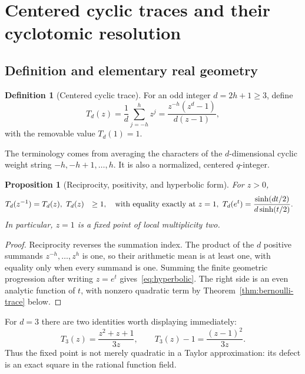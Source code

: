 \documentclass[11pt,oneside]{article}
\newtheorem{proposition}[theorem]{Proposition}
\theoremstyle{definition}
\newtheorem{definition}[theorem]{Definition}
\theoremstyle{remark}
\begin{document}
\section{Centered cyclic traces and their cyclotomic resolution}
\label{sec:trace}

\subsection{Definition and elementary real geometry}

\begin{definition}[Centered cyclic trace]
For an odd integer \(d=2h+1\ge3\), define
\begin{equation}
 T_d(z)=\frac1d\sum_{j=-h}^{h}z^j
 =\frac{z^{-h}(z^d-1)}{d(z-1)},
 \label{eq:Td-definition}
\end{equation}
with the removable value \(T_d(1)=1\).
\end{definition}

The terminology comes from averaging the characters of the \(d\)-dimensional cyclic weight
string \(-h,-h+1,\ldots,h\).  It is also a normalized, centered \(q\)-integer.

\begin{proposition}[Reciprocity, positivity, and hyperbolic form]
\label{prop:basic-trace}
For \(z>0\),
\begin{align}
 T_d(z^{-1})&=T_d(z),\label{eq:reciprocity}\
 T_d(z)&\ge1,\quad\hbox{with equality exactly at }z=1,\label{eq:AMGM}\
 T_d(e^t)&=\frac{\sinh(dt/2)}{d\sinh(t/2)}.\label{eq:hyperbolic}
\end{align}
In particular, \(z=1\) is a fixed point of local multiplicity two.
\end{proposition}

\begin{proof}
Reciprocity reverses the summation index.  The product of the \(d\) positive summands
\(z^{-h},\ldots,z^h\) is one, so their arithmetic mean is at least one, with equality
only when every summand is one.  Summing the finite geometric progression after writing
\(z=e^t\) gives~\eqref{eq:hyperbolic}.  The right side is an even analytic function of
\(t\), with nonzero quadratic term by Theorem~\ref{thm:bernoulli-trace} below.
\end{proof}

For \(d=3\) there are two identities worth displaying immediately:
\begin{equation}
 T_3(z)=\frac{z^2+z+1}{3z},
 \qquad
 T_3(z)-1=\frac{(z-1)^2}{3z}.
 \label{eq:T3-exact}
\end{equation}
Thus the fixed point is not merely quadratic in a Taylor approximation: its defect is an
exact square in the rational function field.
\end{document}
